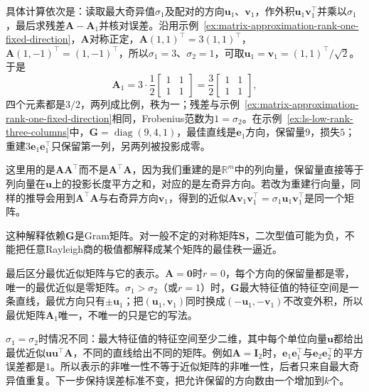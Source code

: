 具体计算依次是：读取最大奇异值$\sigma_1$及配对的方向$\bm u_1$、$\bm v_1$，作外积$\bm u_1\bm v_1^\top$并乘以$\sigma_1$，最后求残差$\bm A-\bm A_1$并核对误差。沿用示例~\ref{ex:matrix-approximation-rank-one-fixed-direction}，$\bm A$对称正定，$\bm A(1,1)^\top=3(1,1)^\top$，$\bm A(1,-1)^\top=(1,-1)^\top$，所以$\sigma_1=3$、$\sigma_2=1$，可取$\bm u_1=\bm v_1=(1,1)^\top/\sqrt2$。于是
\[
 \bm A_1=3\cdot\frac12\begin{bmatrix}1&1\\1&1\end{bmatrix}=\frac32\begin{bmatrix}1&1\\1&1\end{bmatrix},
\]
四个元素都是$3/2$，两列成比例，秩为一；残差与示例~\ref{ex:matrix-approximation-rank-one-fixed-direction}相同，Frobenius范数为$1=\sigma_2$。在示例~\ref{ex:ls-low-rank-three-columns}中，$\bm G=\operatorname{diag}(9,4,1)$，最佳直线是$\bm e_1$方向，保留量$9$，损失$5$；重建$3\bm e_1\bm e_1^\top$只保留第一列，另两列被投影成零。

这里用的是$\bm A\bm A^\top$而不是$\bm A^\top\bm A$，因为我们重建的是$\mathbb R^m$中的列向量，保留量直接等于列向量在$\bm u$上的投影长度平方之和，对应的是左奇异方向。若改为重建行向量，同样的推导会用到$\bm A^\top\bm A$与右奇异方向$\bm v_1$，得到的近似$\bm A\bm v_1\bm v_1^\top=\sigma_1\bm u_1\bm v_1^\top$是同一个矩阵。

这种解释依赖$\bm G$是Gram矩阵。对一般不定的对称矩阵$\bm S$，二次型值可能为负，不能把任意Rayleigh商的极值都解释成某个矩阵的最佳秩一逼近。

最后区分最优近似矩阵与它的表示。$\bm A=\bm0$时$r=0$，每个方向的保留量都是零，唯一的最优近似是零矩阵。$\sigma_1>\sigma_2$（或$r=1$）时，$\bm G$最大特征值的特征空间是一条直线，最优方向只有$\pm\bm u_1$；把$(\bm u_1,\bm v_1)$同时换成$(-\bm u_1,-\bm v_1)$不改变外积，所以最优矩阵$\bm A_1$唯一，不唯一的只是它的写法。

$\sigma_1=\sigma_2$时情况不同：最大特征值的特征空间至少二维，其中每个单位向量$\bm u$都给出最优近似$\bm u\bm u^\top\bm A$，不同的直线给出不同的矩阵。例如$\bm A=\bm I_2$时，$\bm e_1\bm e_1^\top$与$\bm e_2\bm e_2^\top$的平方误差都是$1$。所以表示的非唯一性不等于近似矩阵的非唯一性，后者只来自最大奇异值重复。下一步保持误差标准不变，把允许保留的方向数由一个增加到$k$个。
